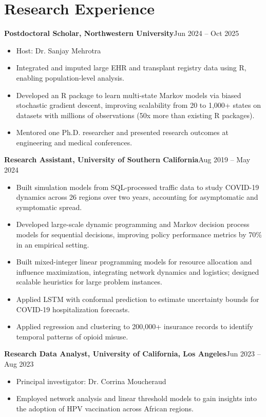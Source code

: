 \documentclass[11pt,letterpaper]{article}
\newcommand{\entry}[2]{\textbf{#1}\hfill #2\par}
\begin{document}
\section{Research Experience}
\entry{Postdoctoral Scholar, Northwestern University}{Jun 2024 -- Oct 2025}
\begin{itemize}
  \item Host: Dr. Sanjay Mehrotra
  \item Integrated and imputed large EHR and transplant registry data using R, enabling population-level analysis.
  \item Developed an R package to learn multi-state Markov models via biased stochastic gradient descent,
        improving scalability from 20 to 1,000+ states on datasets with millions of observations (50x more than
        existing R packages).
  \item Mentored one Ph.D. researcher and presented research outcomes at engineering and medical conferences.
\end{itemize}
\entry{Research Assistant, University of Southern California}{Aug 2019 -- May 2024}
\begin{itemize}
  \item Built simulation models from SQL-processed traffic data to study COVID-19 dynamics across 26 regions over
        two years, accounting for asymptomatic and symptomatic spread.
  \item Developed large-scale dynamic programming and Markov decision process models for sequential decisions,
        improving policy performance metrics by 70\% in an empirical setting.
  \item Built mixed-integer linear programming models for resource allocation and influence maximization,
        integrating network dynamics and logistics; designed scalable heuristics for large problem instances.
  \item Applied LSTM with conformal prediction to estimate uncertainty bounds for COVID-19 hospitalization
        forecasts.
  \item Applied regression and clustering to 200,000+ insurance records to identify temporal patterns of opioid
        misuse.
\end{itemize}
\entry{Research Data Analyst, University of California, Los Angeles}{Jun 2023 -- Aug 2023}
\begin{itemize}
  \item Principal investigator: Dr. Corrina Moucheraud
  \item Employed network analysis and linear threshold models to gain insights into the adoption of HPV
        vaccination across African regions.
\end{itemize}
\end{document}
